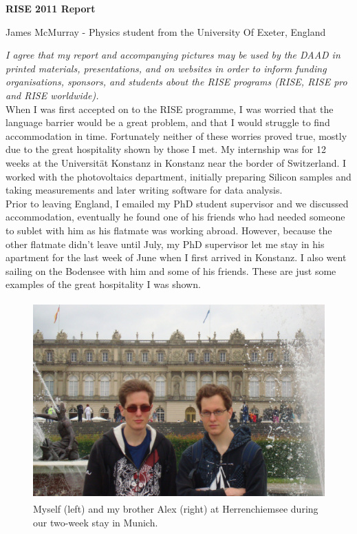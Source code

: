 \documentclass[final,a4paper,oneside,12pt]{article}
\begin{document}
\centerline{\Large \bf{RISE 2011 Report}}
\bigskip
\centerline{James McMurray - Physics student from the University Of Exeter, England}
\bigskip


\emph{I agree that my report and accompanying pictures may be used by the DAAD in printed materials, presentations, and on websites in order to inform funding organisations, sponsors, and students about the RISE programs (RISE, RISE pro and RISE worldwide).}\\

When I was first accepted on to the RISE programme, I was worried that the language barrier would be a great problem, and that I would struggle to find accommodation in time. Fortunately neither of these worries proved true, mostly due to the great hospitality shown by those I met. My internship was for 12 weeks at the Universit\"{a}t Konstanz in Konstanz near the border of Switzerland. I worked with the photovoltaics department, initially preparing Silicon samples and taking measurements and later writing software for data analysis.\\

Prior to leaving England, I emailed my PhD student supervisor and we discussed accommodation, eventually he found one of his friends who had needed someone to sublet with him as his flatmate was working abroad. However, because the other flatmate didn't leave until July, my PhD supervisor let me stay in his apartment for the last week of June when I first arrived in Konstanz. I also went sailing on the Bodensee with him and some of his friends. These are just some examples of the great hospitality I was shown.\\

\begin{center}
\begin{figure}[htp]
\centering
\includegraphics[height=3in]{herrenchiemsee}
\caption{\label{figure2} Myself (left) and my brother Alex (right) at Herrenchiemsee during our two-week stay in Munich.}
\end{figure}
\end{center}
\end{document}
